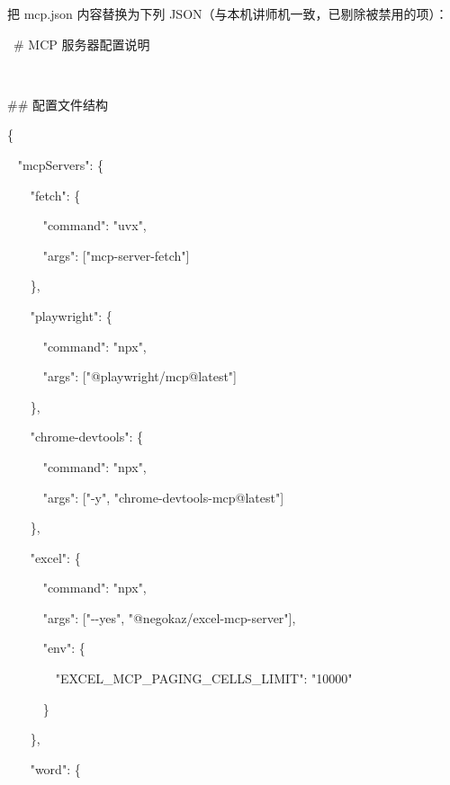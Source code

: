\documentclass[
  american,
  chinese,
]{ctexart}
\begin{document}
{把}\foreignlanguage{american}{ {mcp.json}
}{内容替换为下列}\foreignlanguage{american}{ JSON}{（与本机{讲师机}一致，已剔除被禁用的项）：}\foreignlanguage{american}{}

\foreignlanguage{american}{{~}\# MCP }{服务器配置说明}\foreignlanguage{american}{}

\foreignlanguage{american}{}

~

\foreignlanguage{american}{\#\# }{配置文件结构}\foreignlanguage{american}{}

\foreignlanguage{american}{\{}

\foreignlanguage{american}{{~ }"{mcpServers}{": \{}}

\foreignlanguage{american}{{~~~ }"fetch{": \{}}

\foreignlanguage{american}{{~~~~~
}"command": "{uvx}",}

\foreignlanguage{american}{{~~~~~
}"{args}": {[}"{mcp}-server-fetch"{]}}

\foreignlanguage{american}{{~~~ }\},}

\foreignlanguage{american}{{~~~
}"playwright{": \{}}

\foreignlanguage{american}{{~~~~~
}"command": "{npx}",}

\foreignlanguage{american}{{~~~~~
}"{args}": {[}"@playwright/{mcp@latest}"{]}}

\foreignlanguage{american}{{~~~ }\},}

\foreignlanguage{american}{{~~~ }"{chrome}-{devtools}": \{}

\foreignlanguage{american}{{~~~~~
}"command": "{npx}",}

\foreignlanguage{american}{{~~~~~
}"{args}": {[}"-y", "{chrome-devtools-mcp@latest}"{]}}

\foreignlanguage{american}{{~~~ }\},}

\foreignlanguage{american}{{~~~ }"excel{": \{}}

\foreignlanguage{american}{{~~~~~
}"command": "{npx}",}

\foreignlanguage{american}{{~~~~~
}"{args}": {[}"-\/-yes"{, "@}{negokaz}/excel-{mcp}-server"{]},}

\foreignlanguage{american}{{~~~~~
}"env{": \{}}

\foreignlanguage{american}{{~~~~~~~
}"EXCEL\_MCP\_PAGING\_CELLS\_LIMIT": "10000"}

\foreignlanguage{american}{{~~~~~ }\}}

\foreignlanguage{american}{{~~~ }\},}

\foreignlanguage{american}{{~~~ }"word{": \{}}
\end{document}
